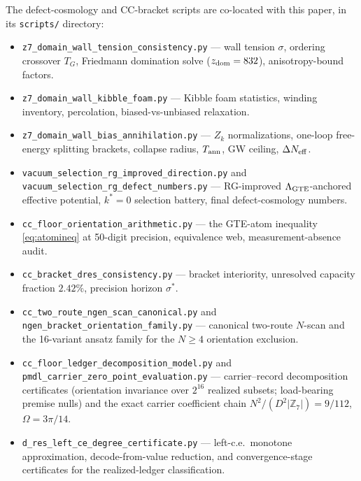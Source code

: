 \documentclass[11pt]{article}
\theoremstyle{remark}
\newcommand{\ZS}{\mathbb{Z}_7}
\begin{document}
The defect-cosmology and CC-bracket scripts are co-located with this paper, in
its \texttt{scripts/} directory:

\begin{itemize}[noitemsep,topsep=2pt]
  \item \texttt{z7\_domain\_wall\_tension\_consistency.py}
        --- wall tension $\sigma$, ordering crossover $T_G$, Friedmann
        domination solve ($z_{\rm dom} = 832$), anisotropy-bound factors.
  \item \texttt{z7\_domain\_wall\_kibble\_foam.py}
        --- Kibble foam statistics, winding inventory, percolation,
        biased-vs-unbiased relaxation.
  \item \texttt{z7\_domain\_wall\_bias\_annihilation.py}
        --- $Z_k$ normalizations, one-loop free-energy splitting brackets,
        collapse radius, $T_{\rm ann}$, GW ceiling, $\Delta N_{\rm eff}$.
  \item \texttt{vacuum\_selection\_rg\_improved\_direction.py} and
        \texttt{vacuum\_selection\_rg\_defect\_numbers.py}
        --- RG-improved $\Lambda_{\rm GTE}$-anchored effective potential,
        $k^* = 0$ selection battery, final defect-cosmology numbers.
  \item \texttt{cc\_floor\_orientation\_arithmetic.py}
        --- the GTE-atom inequality \eqref{eq:atomineq} at 50-digit precision,
        equivalence web, measurement-absence audit.
  \item \texttt{cc\_bracket\_dres\_consistency.py}
        --- bracket interiority, unresolved capacity fraction $2.42\%$,
        precision horizon $\sigma^*$.
  \item \texttt{cc\_two\_route\_ngen\_scan\_canonical.py} and
        \texttt{ngen\_bracket\_orientation\_family.py}
        --- canonical two-route $N$-scan and the 16-variant ansatz family for
        the $N \ge 4$ orientation exclusion.
  \item \texttt{cc\_floor\_ledger\_decomposition\_model.py} and
        \texttt{pmdl\_carrier\_zero\_point\_evaluation.py}
        --- carrier--record decomposition certificates (orientation invariance
        over $2^{16}$ realized subsets; load-bearing premise nulls) and the
        exact carrier coefficient chain $N^2/(D^2|\ZS|) = 9/112$,
        $\Omega = 3\pi/14$.
  \item \texttt{d\_res\_left\_ce\_degree\_certificate.py}
        --- left-c.e.\ monotone approximation, decode-from-value reduction, and
        convergence-stage certificates for the realized-ledger classification.
\end{itemize}
\end{document}
